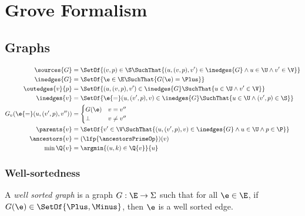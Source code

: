 \section{Grove Formalism}
\label{sec:Grove Formalism}




\subsection{Graphs}
\label{sec:Formalism:Graphs}

\begin{align*}
  \sources{G} &= \SetOf{(v, p) \in \S \SuchThat{
    (u, (v, p), v') \in \inedges{G} \land u \in \U \land v' \in \V}} \\
  \inedges{G} &= \SetOf{\e \in \E \SuchThat{G(\e) = \Plus}} \\
  \outedges{v}{p} &= \SetOf{(u, (v, p), v') \in \inedges{G} \SuchThat{u \in \U \land v' \in \V }} \\
  \inedges{v} &= \SetOf{\e{=}(u, (v', p), v) \in \inedges{G} \SuchThat{u \in \U \land (v', p) \in \S}} \\
  G_v(\e{=}(u, (v', p), v'')) &= \begin{cases}
    G(\e) & v = v'' \\
    \bot  & v \neq v'' \\
  \end{cases} \\
  \parents{v} &= \SetOf{v' \in \V \SuchThat{(u, (v', p), v) \in \inedges{G} \land u \in \U \land p \in \P}} \\
  \ancestors{v} &= \mathopen{}\left( \lfp{\ancestorsPrimeOp} \right)\mathclose{}(v) \\
  \min{\Q{v}} &= \argmin{(u, k) \in \Q{v}}{u}
\end{align*}


\subsubsection{Well-sortedness}

\begin{definition}
  A \emph{well sorted graph} is a graph $G : \E \rightarrow \Sigma$
  such that for all $\e \in \E$,
  if $G(\e) \in \SetOf{\Plus, \Minus}$,
  then $\e$ is a well sorted edge. 
\end{definition}

